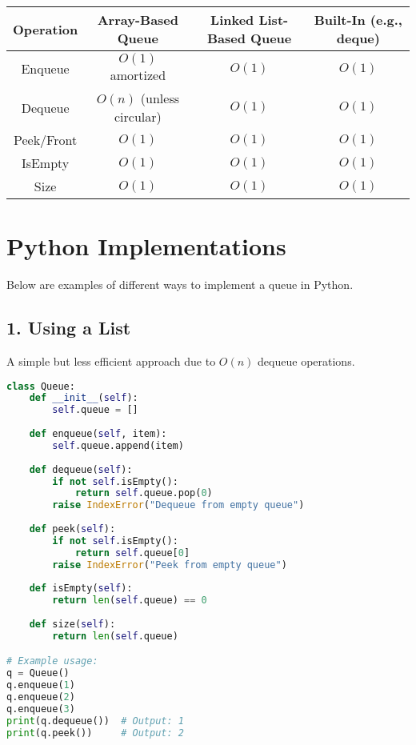 \begin{center}
\begin{tabular}{|c|c|c|c|}
\hline
\textbf{Operation} & \textbf{Array-Based Queue} & \textbf{Linked List-Based Queue} & \textbf{Built-In (e.g., deque)} \\
\hline
Enqueue            & \(O(1)\) amortized         & \(O(1)\)                        & \(O(1)\)                    \\
\hline
Dequeue            & \(O(n)\) (unless circular)& \(O(1)\)                        & \(O(1)\)                    \\
\hline
Peek/Front         & \(O(1)\)                   & \(O(1)\)                        & \(O(1)\)                    \\
\hline
IsEmpty            & \(O(1)\)                   & \(O(1)\)                        & \(O(1)\)                    \\
\hline
Size               & \(O(1)\)                   & \(O(1)\)                        & \(O(1)\)                    \\
\hline
\end{tabular}
\end{center}

\section{Python Implementations}

Below are examples of different ways to implement a queue in Python.

\subsection*{1. Using a List}
A simple but less efficient approach due to \(O(n)\) dequeue operations.

\begin{fullwidth}
\begin{lstlisting}[language=Python]
class Queue:
    def __init__(self):
        self.queue = []
    
    def enqueue(self, item):
        self.queue.append(item)
    
    def dequeue(self):
        if not self.isEmpty():
            return self.queue.pop(0)
        raise IndexError("Dequeue from empty queue")
    
    def peek(self):
        if not self.isEmpty():
            return self.queue[0]
        raise IndexError("Peek from empty queue")
    
    def isEmpty(self):
        return len(self.queue) == 0
    
    def size(self):
        return len(self.queue)

# Example usage:
q = Queue()
q.enqueue(1)
q.enqueue(2)
q.enqueue(3)
print(q.dequeue())  # Output: 1
print(q.peek())     # Output: 2
\end{lstlisting}
\end{fullwidth}

